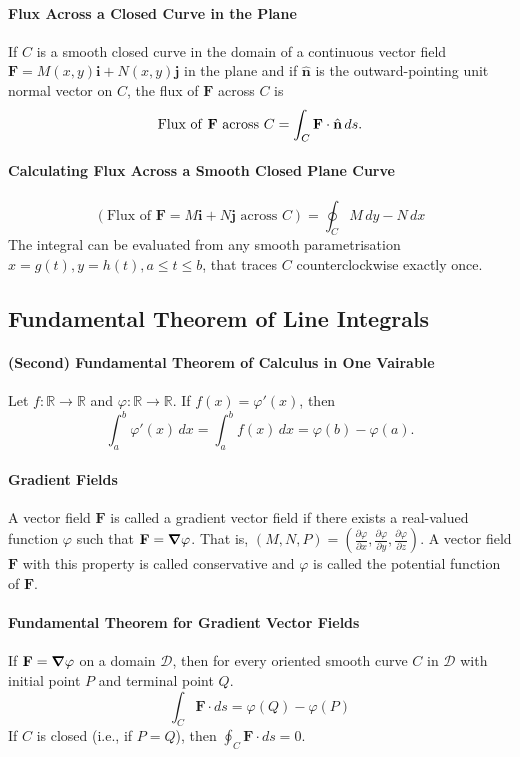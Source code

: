 \paragraph{Flux Across a Closed Curve in the Plane}
If \(C\) is a smooth closed curve in the domain of a continuous vector field \(\textbf{F} = M(x,y)\textbf{i} + N(x,y)\textbf{j}\) in the plane and if \(\hat{\textbf{n}}\) is the outward-pointing unit normal vector on \(C\), the flux of \(\textbf{F}\) across \(C\) is
\[\text{Flux of \textbf{F} across } C = \int_C \textbf{F} \cdot \hat{\textbf{n}} \, ds.\]

\paragraph{Calculating Flux Across a Smooth Closed Plane Curve}
\[(\text{Flux of } \textbf{F} = M\textbf{i} + N\textbf{j} \text{ across } C) = \oint_C M \, dy - N \, dx \]
The integral can be evaluated from any smooth parametrisation \(x = g(t), y = h(t), a \leq t \leq b\), that traces \(C\) counterclockwise exactly once.

\subsection{Fundamental Theorem of Line Integrals}
\paragraph{(Second) Fundamental Theorem of Calculus in One Vairable}
Let \(f: \mathbb R \to \mathbb R\) and \(\varphi: \mathbb R \to \mathbb R\). If \(f(x) = \varphi'(x)\), then 
\[\int_a^b \varphi'(x) \, dx = \int_a^b f(x) \, dx = \varphi(b) - \varphi(a).\]

\paragraph{Gradient Fields}
A vector field \(\textbf{F}\) is called a gradient vector field if there exists a real-valued function \(\varphi\) such that \(\textbf{F} = \grad\varphi\). That is, \((M, N, P) = (\frac{\partial \varphi}{\partial x}, \frac{\partial \varphi}{\partial y}, \frac{\partial \varphi}{\partial z})\). A vector field \(\textbf{F}\) with this property is called conservative and \(\varphi\) is called the potential function of \(\textbf{F}\).

\paragraph{Fundamental Theorem for Gradient Vector Fields}
If \(\textbf{F} = \grad\varphi\) on a domain \(\mathcal{D}\), then for every oriented smooth curve \(C\) in \(\mathcal D\) with initial point \(P\) and terminal point \(Q\).
\[\int_C \textbf{F} \cdot ds = \varphi(Q) - \varphi(P)\]
If \(C\) is closed (i.e., if \(P = Q\)), then \(\oint_C \textbf{F} \cdot ds = 0\).


